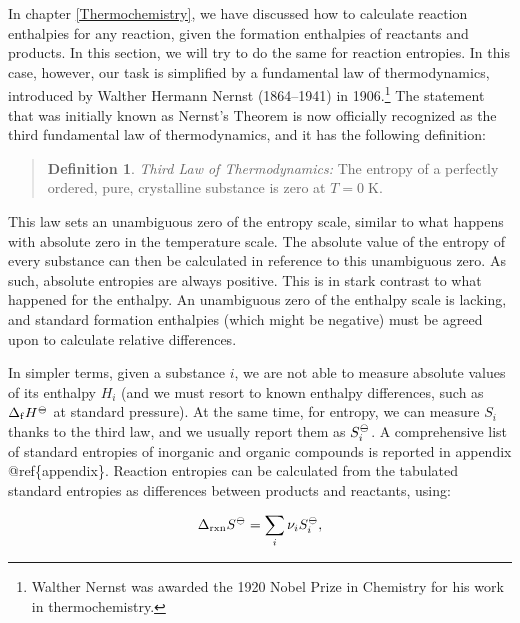 \documentclass[
]{book}
\theoremstyle{definition}
\newtheorem{definition}{Definition}[chapter]
\theoremstyle{definition}
\theoremstyle{definition}
\theoremstyle{remark}
\begin{document}
In chapter \ref{Thermochemistry}, we have discussed how to calculate reaction enthalpies for any reaction, given the formation enthalpies of reactants and products. In this section, we will try to do the same for reaction entropies. In this case, however, our task is simplified by a fundamental law of thermodynamics, introduced by Walther Hermann Nernst (1864--1941) in 1906.\footnote{Walther Nernst was awarded the 1920 Nobel Prize in Chemistry for his work in thermochemistry.} The statement that was initially known as Nernst's Theorem is now officially recognized as the third fundamental law of thermodynamics, and it has the following definition:

\begin{quote}
\begin{definition}
\protect\hypertarget{def:thirdlawdef}{}{\label{def:thirdlawdef} }\emph{Third Law of Thermodynamics:} The entropy of a perfectly ordered, pure, crystalline substance is zero at \(T=0 \; \text{K}\).
\end{definition}
\end{quote}

This law sets an unambiguous zero of the entropy scale, similar to what happens with absolute zero in the temperature scale. The absolute value of the entropy of every substance can then be calculated in reference to this unambiguous zero. As such, absolute entropies are always positive. This is in stark contrast to what happened for the enthalpy. An unambiguous zero of the enthalpy scale is lacking, and standard formation enthalpies (which might be negative) must be agreed upon to calculate relative differences.

In simpler terms, given a substance \(i\), we are not able to measure absolute values of its enthalpy \(H_i\) (and we must resort to known enthalpy differences, such as \(\Delta_{\mathrm{f}} H^{-\kern-6pt{\ominus}\kern-6pt-}\) at standard pressure). At the same time, for entropy, we can measure \(S_i\) thanks to the third law, and we usually report them as \(S_i^{-\kern-6pt{\ominus}\kern-6pt-}\). A comprehensive list of standard entropies of inorganic and organic compounds is reported in appendix @ref\{appendix\}. Reaction entropies can be calculated from the tabulated standard entropies as differences between products and reactants, using:

\begin{equation}
\Delta_{\text{rxn}} S^{-\kern-6pt{\ominus}\kern-6pt-}= \sum_i \nu_i S_i^{-\kern-6pt{\ominus}\kern-6pt-},
\label{eq:thirdlaweq}
\end{equation}
\end{document}
